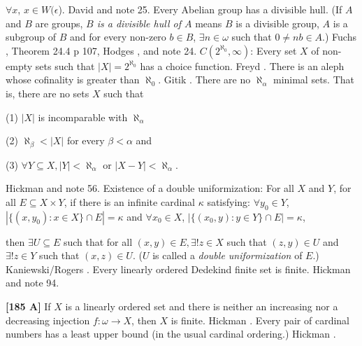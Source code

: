 $\forall x$, $x\in W(\epsilon$). \ac{David} \cite{1980} and note 25.
\medskip
{} Every Abelian group has a divisible
hull.  (If $A$ and $B$  are groups, {\it $B$ is a divisible hull of $A$}
means $B$ is a divisible group, $A$ is a subgroup of $B$ and for
every non-zero $b \in  B$, $\exists  n \in \omega $  such
that $0\neq nb\in A$.)  \ac{Fuchs} \cite{1970}, Theorem 24.4 p 107,
\ac{Hodges} \cite{1980}, and note 24.
\medskip
{} $C(2^{\aleph_0},\infty)$: Every set $X$ of
non-empty sets such that $|X|=2^{\aleph_0}$ has a choice function.
\ac{Freyd} \cite{1980}.
\medskip
{} There is an aleph whose cofinality is greater
than $\aleph_{0}$.  \ac{Gitik} \cite{1980}.
\medskip
{}  There are no $\aleph_{\alpha}$
minimal  sets.  That is, there are no sets $X$ such that
\item\item{}{(1)} $|X|$ is incomparable with $\aleph_{\alpha}$
\item\item{}{(2)} $\aleph_{\beta}<|X|$ for every $\beta < \alpha $ and
\item\item{}{(3)} $\forall Y\subseteq X, |Y|<\aleph_{\alpha}$ or $|X-Y|
<\aleph_{\alpha}$.
\item{} \ac{Hickman} \cite{1980b} and note 56.
\medskip
{}  Existence of a double uniformization: For all
$X$ and $Y$, for all $E\subseteq X\times Y$, if there is an infinite
cardinal $\kappa$ satisfying:
 $\forall y_0\in Y$, $|\{(x,y_0): x\in X\}\cap E| =\kappa$
and
 $\forall x_0\in X$, $|\{(x_0,y): y\in Y\}\cap E| = \kappa$,
\item{} then $\exists U\subseteq E$ such that for all $(x,y)\in E,
\exists !z\in X$ such that $(z,y)\in U$ and $\exists !z\in Y$ such that
$(x,z)\in U$. ($U$ is called a {\it double uniformization} of $E$.)
\ac{Kaniewski/Rogers} \cite{1980}.  
\medskip
{}  Every linearly ordered Dedekind finite set is
finite.  \ac{Hickman} \cite{1979a} and note 94.
\smallskip
\item{}{\bf [185 A]}  If $X$ is a linearly ordered set and there is
neither an increasing nor a decreasing injection $f:\omega\rightarrow X$,
then $X$ is finite.  \ac{Hickman} \cite{1979a}.
\medskip
{}  Every pair of cardinal numbers has a least upper
bound (in the usual cardinal ordering.)  \ac{Hickman} \cite{1979b}.
